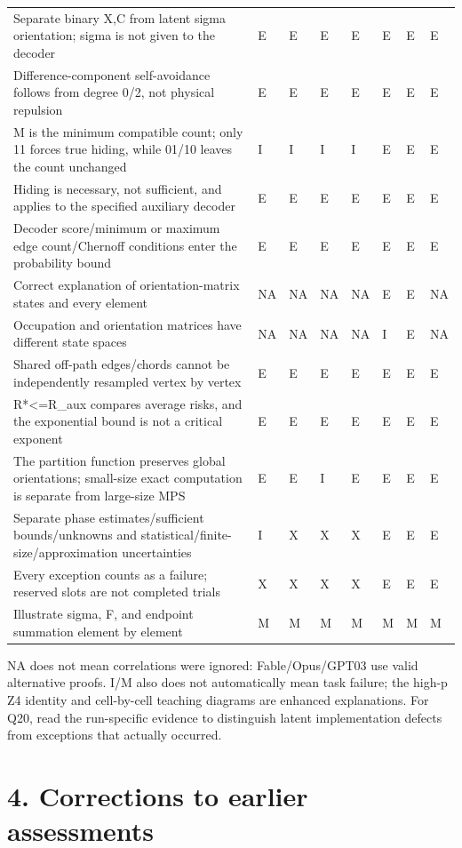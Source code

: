 \documentclass[11pt,a4paper]{article}
\begin{document}
{\begin{longtable}
{}Separate binary X,C from latent sigma orientation; sigma is not given to the decoder & E & E & E & E & E & E & E\tabularnewline
{}Difference-component self-avoidance follows from degree 0/\allowbreak{}2, not physical repulsion & E & E & E & E & E & E & E\tabularnewline
{}M is the minimum compatible count; only 11 forces true hiding, while 01/\allowbreak{}10 leaves the count unchanged & I & I & I & I & E & E & E\tabularnewline
{}Hiding is necessary, not sufficient, and applies to the specified auxiliary decoder & E & E & E & E & E & E & E\tabularnewline
{}Decoder score/\allowbreak{}minimum or maximum edge count/\allowbreak{}Chernoff conditions enter the probability bound & E & E & E & E & E & E & E\tabularnewline
{}Correct explanation of orientation-matrix states and every element & NA & NA & NA & NA & E & E & NA\tabularnewline
{}Occupation and orientation matrices have different state spaces & NA & NA & NA & NA & I & E & NA\tabularnewline
{}Shared off-path edges/\allowbreak{}chords cannot be independently resampled vertex by vertex & E & E & E & E & E & E & E\tabularnewline
{}R*<=R\_aux compares average risks, and the exponential bound is not a critical exponent & E & E & E & E & E & E & E\tabularnewline
{}The partition function preserves global orientations; small-size exact computation is separate from large-size MPS & E & E & I & E & E & E & E\tabularnewline
{}Separate phase estimates/\allowbreak{}sufficient bounds/\allowbreak{}unknowns and statistical/\allowbreak{}finite-size/\allowbreak{}approximation uncertainties & I & X & X & X & E & E & E\tabularnewline
{}Every exception counts as a failure; reserved slots are not completed trials & X & X & X & X & E & E & E\tabularnewline
{}Illustrate sigma, F, and endpoint summation element by element & M & M & M & M & M & M & M\tabularnewline
\bottomrule
\end{longtable}
}

NA does not mean correlations were ignored: Fable/\allowbreak{}Opus/\allowbreak{}GPT03 use valid alternative proofs. I/\allowbreak{}M also does not automatically mean task failure; the high-p Z4 identity and cell-by-cell teaching diagrams are enhanced explanations. For Q20, read the run-specific evidence to distinguish latent implementation defects from exceptions that actually occurred.

\section*{4. Corrections to earlier assessments}
\end{document}
